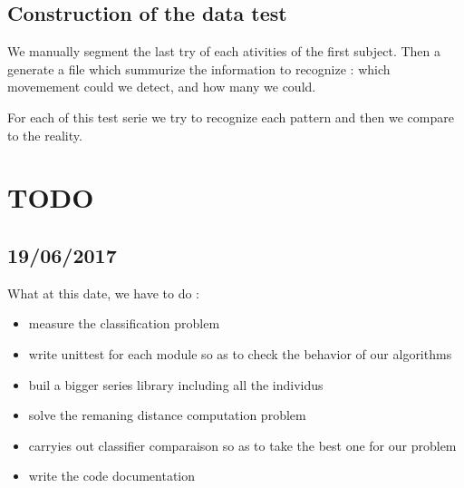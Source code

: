 \documentclass[a4,12pt]{article}
\begin{document}
	
	\subsection{Construction of the data test}
	
		We manually segment the last try of each ativities of the first subject. Then a generate a file which summurize the information to recognize : which movemement could we detect, and how many we could.
		
		For each of this test serie we try to recognize each pattern and then we compare to the reality.
		
	\section{TODO}
	
	\subsection{19/06/2017}

	What at this date, we have to do :
	\begin{itemize}
		\item measure the classification problem
		\item write unittest for each module so as to check the behavior of our algorithms
		\item buil a bigger series library including all the individus
		\item solve the remaning distance computation problem
		\item carryies out classifier comparaison so as to take the best one for our problem
		\item write the code documentation
	\end{itemize}		

	
		
	
	
\end{document}
